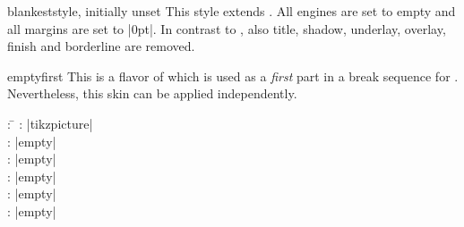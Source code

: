 \clearpage
\begin{docTcbKey}{blankest}{}{style, initially unset}
  This style extends .
  All engines are set to empty and all margins are set to |0pt|.
  In contrast to , also title, shadow, underlay,
  overlay, finish and borderline are removed.

\begin{dispExample}
\begin{tcbraster}[raster columns=3,raster equal height,
    title=Box \thetcbrasternum,
    enhanced,size=small,colframe=red!50!black,colback=red!10!white,
    coltitle=yellow!85!black,
    drop fuzzy shadow,watermark text={Box \thetcbrasternum},
    borderline={.25mm}{-0.5mm}{green!40!black},
    finish={\begin{tcbclipframe}\draw[blue,opacity=0.1,line width=1cm]
      (frame.south west) -- (frame.north east);\end{tcbclipframe}},
    ]
  \begin{tcolorbox}\lipsum[4]\end{tcolorbox}
  \begin{tcolorbox}[blanker]\lipsum[4]\end{tcolorbox}
  \begin{tcolorbox}[blankest]\lipsum[4]\end{tcolorbox}
\end{tcbraster}
\end{dispExample}
\end{docTcbKey}


\clearpage
\begin{docSkin}{emptyfirst}
This is a flavor of  which is used as a \emph{first} part
in a break sequence for .
Nevertheless, this skin can be applied independently.
\begin{tcolorbox}[skintable=emptyfirst]
  \begin{tabbing}
    : \=\kill
    :  \> |tikzpicture|\\ 
    :           \> |empty|\\
    : \> |empty|\\ 
    :        \> |empty|\\
    :    \> |empty|\\
    :           \> |empty|
  \end{tabbing}
\end{tcolorbox}
\end{docSkin}


